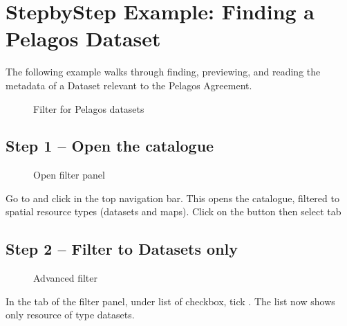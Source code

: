 \documentclass[letterpaper,10pt,english]{sphinxmanual}
\begin{document}
\section{Step\sphinxhyphen{}by\sphinxhyphen{}Step Example: Finding a Pelagos Dataset}
\label{\detokenize{02_find_and_visualize:step-by-step-example-finding-a-pelagos-dataset}}
\sphinxAtStartPar
The following example walks through finding, previewing, and reading the metadata of a
Dataset relevant to the Pelagos Agreement.

\begin{figure}[htbp]
\centering
\capstart

\noindent{}
\caption{Filter for Pelagos datasets}\label{\detokenize{02_find_and_visualize:id5}}\end{figure}


\subsection{Step 1 – Open the catalogue}
\label{\detokenize{02_find_and_visualize:step-1-open-the-catalogue}}
\begin{figure}[htbp]
\centering
\capstart

\noindent{}
\caption{Open filter panel}\label{\detokenize{02_find_and_visualize:id6}}\end{figure}

\sphinxAtStartPar
Go to  and click  in the top navigation bar.
This opens the  catalogue, filtered to spatial resource types (datasets and maps).
Click on the  button then select  tab


\subsection{Step 2 – Filter to Datasets only}
\label{\detokenize{02_find_and_visualize:step-2-filter-to-datasets-only}}
\begin{figure}[htbp]
\centering
\capstart

\noindent{}
\caption{Advanced filter}\label{\detokenize{02_find_and_visualize:id7}}\end{figure}

\sphinxAtStartPar
In the  tab of the filter panel, under  list of checkbox, tick .
The list now shows only resource of type datasets.
\end{document}
